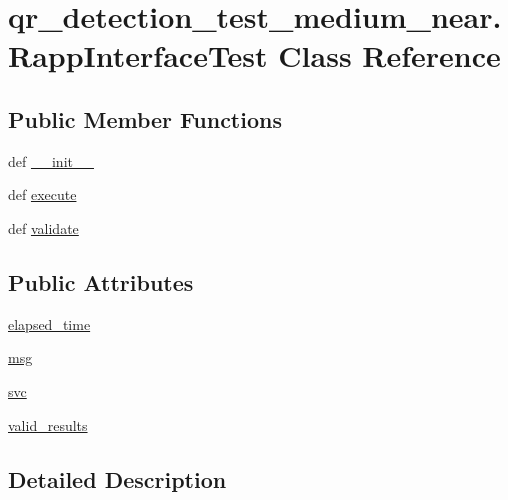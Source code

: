 \hypertarget{classqr__detection__test__medium__near_1_1RappInterfaceTest}{\section{qr\-\_\-detection\-\_\-test\-\_\-medium\-\_\-near.\-Rapp\-Interface\-Test Class Reference}
\label{classqr__detection__test__medium__near_1_1RappInterfaceTest}
}
\subsection*{Public Member Functions}
\begin{DoxyCompactItemize}
\item 
def \hyperlink{classqr__detection__test__medium__near_1_1RappInterfaceTest_aab49a236617b958743d488ae4ccd0350}{\-\_\-\-\_\-init\-\_\-\-\_\-}
\item 
def \hyperlink{classqr__detection__test__medium__near_1_1RappInterfaceTest_ab082c51ebc7d2718f953135a5743cd35}{execute}
\item 
def \hyperlink{classqr__detection__test__medium__near_1_1RappInterfaceTest_aa04fb0131ff2c6fdc030b5dfdd139c02}{validate}
\end{DoxyCompactItemize}
\subsection*{Public Attributes}
\begin{DoxyCompactItemize}
\item 
\hyperlink{classqr__detection__test__medium__near_1_1RappInterfaceTest_ac038deafc8d7d747a2c79a3b92d63fa3}{elapsed\-\_\-time}
\item 
\hyperlink{classqr__detection__test__medium__near_1_1RappInterfaceTest_af0fc6471dc75a79cc6b04d89579758eb}{msg}
\item 
\hyperlink{classqr__detection__test__medium__near_1_1RappInterfaceTest_a2d86a8cd25107afaf759fa80fa820bcc}{svc}
\item 
\hyperlink{classqr__detection__test__medium__near_1_1RappInterfaceTest_a170e7b4dbd6ff937ceb28b9a15732ade}{valid\-\_\-results}
\end{DoxyCompactItemize}


\subsection{Detailed Description}


